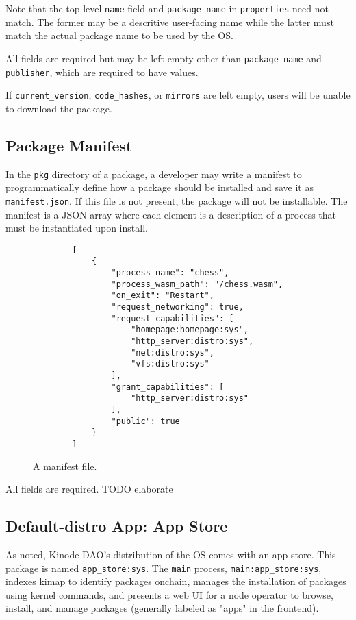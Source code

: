 \documentclass[runningheads]{llncs}
\begin{document}
Note that the top-level \verb|name| field and \verb|package_name| in \verb|properties| need not match. The former may be a descritive user-facing name while the latter must match the actual package name to be used by the OS.

All fields are required but may be left empty other than \verb|package_name| and \verb|publisher|, which are required to have values.

If \verb|current_version|, \verb|code_hashes|, or \verb|mirrors| are left empty, users will be unable to download the package.

\subsection{Package Manifest}

In the \verb|pkg| directory of a package, a developer may write a manifest to programmatically define how a package should be installed and save it as \verb|manifest.json|.
If this file is not present, the package will not be installable.
The manifest is a JSON array where each element is a description of a process that must be instantiated upon install.

\begin{figure}[H]
    \centering
    \begin{lstlisting}
        [
            {
                "process_name": "chess",
                "process_wasm_path": "/chess.wasm",
                "on_exit": "Restart",
                "request_networking": true,
                "request_capabilities": [
                    "homepage:homepage:sys",
                    "http_server:distro:sys",
                    "net:distro:sys",
                    "vfs:distro:sys"
                ],
                "grant_capabilities": [
                    "http_server:distro:sys"
                ],
                "public": true
            }
        ]
    \end{lstlisting}
    \caption{A manifest file.}
    \label{fig:example manifest.json}
\end{figure}

All fields are required.
TODO elaborate

\subsection{Default-distro App: App Store}

As noted, Kinode DAO's distribution of the OS comes with an app store.
This package is named \verb|app_store:sys|.
The \verb|main| process, \verb|main:app_store:sys|, indexes kimap to identify packages onchain, manages the installation of packages using kernel commands, and presents a web UI for a node operator to browse, install, and manage packages (generally labeled as "apps" in the frontend).
\end{document}
